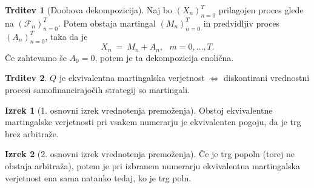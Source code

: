 \documentclass[11pt]{article}
\newcommand{\F}{\mathcal{F}}
\theoremstyle{definition}
\theoremstyle{definition}
\newtheorem{trditev}{Trditev}[section]
\newtheorem{izrek}{Izrek}[section]
\begin{document}
\begin{trditev}[Doobova dekompozicija]

Naj bo $(X_n)_{n=0}^T$ prilagojen proces glede na $(\F_n)_{n=0}^T$. Potem obstaja martingal $(M_n)_{n=0}^T$ in predvidljiv proces $(A_n)_{n=0}^T$, taka da je
$$X_n ~=~ M_n + A_n, ~~~m = 0, \ldots, T.$$
Če zahtevamo še $A_0 = 0$, potem je ta dekompozicija enolična.

\end{trditev}
\vspace{0.5cm}

\begin{trditev}

$Q$ je ekvivalentna martingalska verjetnost $\iff$ diskontirani vrednostni procesi samofinancirajočih strategij so martingali.

\end{trditev}
\vspace{0.5cm}

\begin{izrek}[1. osnovni izrek vrednotenja premoženja]

Obstoj ekvivalentne martingalske verjetnosti pri vsakem numerarju je ekvivalenten pogoju, da je trg brez arbitraže.

\end{izrek}
\vspace{0.5cm}

\begin{izrek}[2. osnovni izrek vrednotenja premoženja]

Če je trg popoln (torej ne obstaja arbitraža), potem je pri izbranem numerarju ekvivalentna martingalska verjetnost ena sama natanko tedaj, ko je trg poln.

\end{izrek}
\vspace{0.5cm}

\pagebreak

\end{document}

